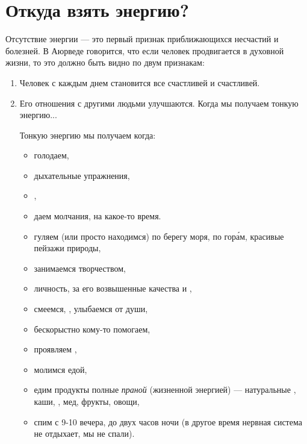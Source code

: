 \section{Откуда взять энергию?}
Отсутствие энергии --- это первый признак приближающихся несчастий и болезней. В Аюрведе говорится, что если человек продвигается в духовной жизни, то это должно быть видно по двум признакам:

\begin{enumerate}[noitemsep]
    \item Человек с каждым днем становится все счастливей и счастливей.
    \item Его отношения с другими людьми улучшаются. Когда мы получаем тонкую энергию...

          Тонкую энергию мы получаем когда:
          \begin{itemize}[noitemsep, label=+]
              \item голодаем,
              \item {} дыхательные упражнения,
              \item {},
              \item даем  молчания, на какое-то время.
              \item гуляем (или просто находимся) по берегу моря, по гор\'{а}м,  красивые пейзажи природы,
              \item занимаемся  творчеством,
              \item {}  личность, за его возвышенные качества и ,
              \item смеемся, , улыбаемся от души,
              \item бескорыстно кому-то помогаем,
              \item проявляем ,
              \item молимся  едой,
              \item едим продукты полные \textit{праной} (жизненной энергией) --- натуральные , каши, , мед, фрукты, овощи,
              \item спим с 9-10 вечера, до двух часов ночи (в другое время нервная система не отдыхает,  мы не спали).

\end{itemize}
\end{enumerate}
